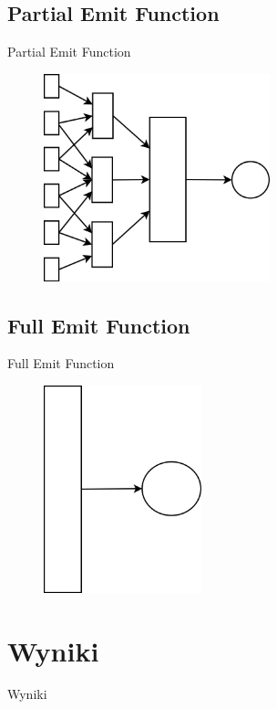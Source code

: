 \documentclass{beamer}
\begin{document}
\subsection*{Partial Emit Function}

\begin{frame}{Partial Emit Function}
\begin{figure}[H]
	\begin{center}
  		\includegraphics[height=6cm]{PresentationPartial.png}
	\end{center}
\end{figure}
\end{frame}

\subsection*{Full Emit Function}

\begin{frame}{Full Emit Function}
\begin{figure}[H]
	\begin{center}
  		\includegraphics[height=6cm]{PresentationFull.png}
	\end{center}
\end{figure}
\end{frame}


\section{Wyniki}
\begin{frame}{}
\begin{center}
\huge{Wyniki}
\end{center}
\end{frame}
\end{document}
